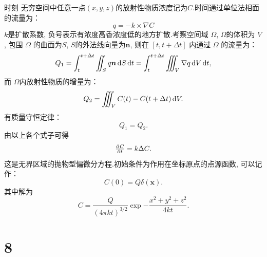 \documentclass[12pt]{article}
\begin{document}
时刻 无穷空间中任意一点$(x,y,z)$的放射性物质浓度记为$C$.时间通过单位法相面的流量为： 
\begin{equation}
	q = - k \times \nabla C
\end{equation}
$k$是扩散系数, 负号表示有浓度高香浓度低的地方扩散.考察空间域 $\Omega$, $\Omega$的体积为 $V$, 包围 $\Omega$ 的曲面为$S$, $S$的外法线向量为$\bm{n}$, 则在 $[t,t+\Delta t]$ 内通过 $\Omega$ 的流量为： 
\begin{equation}
	Q_1 = \int_t^{t+\Delta t}\iint_S q\bm{n} \dif S \dif t = \int_t^{t+\Delta t} \iiint_V \nabla q \dif V \dif t ,
\end{equation}
而 $\Omega$内放射性物质的增量为： 
\begin{equation}
	Q_2 = \iiint_V C(t) - C(t+\Delta t) \dif V.
\end{equation}
有质量守恒定律：
\begin{equation}
	Q_1 = Q_2.
\end{equation}
由以上各个式子可得
\begin{equation}
	\pd{C}{t} = k \Delta C.
\end{equation}
这是无界区域的抛物型偏微分方程.初始条件为作用在坐标原点的点源函数, 可以记作：
\begin{equation}
	C(0) = Q\delta(\bm{x}).
\end{equation}
其中解为
\begin{equation}
	C = \frac{Q}{(4 \pi k t)^{3/2}} \exp{-\frac{x^2+y^2+z^2}{4kt}}.
\end{equation}



\section{8}
\end{document}
